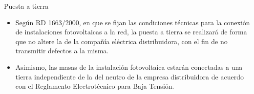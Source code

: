 \documentclass[xcolor={usenames,svgnames,dvipsnames}]{beamer}
\begin{document}
\begin{frame}[label=sec-5-2-8]{Puesta a tierra}
\begin{itemize}
\item Según RD 1663/2000, en que se fijan las condiciones técnicas para la conexión de instalaciones fotovoltaicas a la red, \alert{la puesta a tierra} se realizará de forma que \alert{no altere la de la compañía eléctrica distribuidora}, con el fin de no transmitir defectos a la misma.

\item Asimismo, \alert{las masas de la instalación fotovoltaica estarán conectadas a una tierra independiente de la del neutro} de la empresa distribuidora de acuerdo con el Reglamento Electrotécnico para Baja Tensión.
\end{itemize}
\end{frame}
\end{document}
